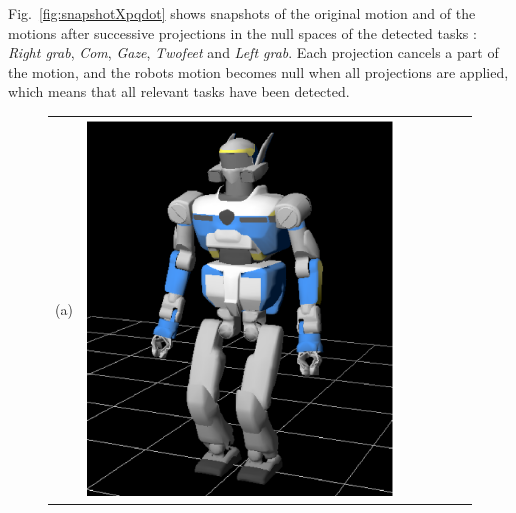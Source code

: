 \documentclass[journal]{IEEEtran}
\begin{document}
Fig.~\ref{fig:snapshotXpqdot} shows snapshots of the original motion
and of the motions after successive projections
in the null spaces of the detected
tasks : \emph{Right grab}, \emph{Com}, \emph{Gaze}, \emph{Twofeet} and \emph{Left grab}.
Each projection cancels a part of the motion, and the robots motion becomes null when all
projections are applied,
which means that all relevant tasks have been detected.
\begin{figure}[t]
\centering
\begin{tabular}{c@{}c@{}c@{}c@{}c@{}c@{}c}
(a)&
\parbox[c]{2.0cm}{\includegraphics[width=\linewidth]{img/Pqdot0_0.png.ps}} &

\end{tabular}
\end{figure}
\end{document}
